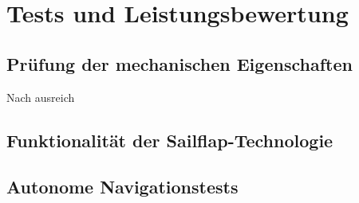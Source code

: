 

\chapter{Tests und Leistungsbewertung}
\label{chap:tests}


\section{Prüfung der mechanischen Eigenschaften}
Nach ausreich

\section{Funktionalität der Sailflap-Technologie}

\section{Autonome Navigationstests}
